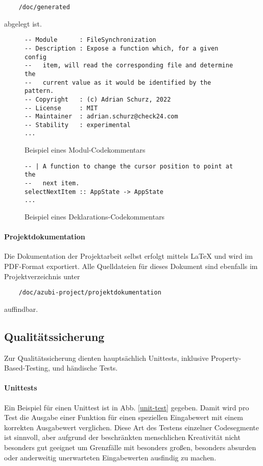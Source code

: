 \begin{verbatim}
    /doc/generated
\end{verbatim}

abgelegt ist.

\begin{figure}
    \caption{Beispiel eines Modul-Codekommentars}
    \label{codecomment-module}
    \begin{verbatim}
-- Module      : FileSynchronization
-- Description : Expose a function which, for a given config
--   item, will read the corresponding file and determine the
--   current value as it would be identified by the pattern.
-- Copyright   : (c) Adrian Schurz, 2022
-- License     : MIT
-- Maintainer  : adrian.schurz@check24.com
-- Stability   : experimental
...
    \end{verbatim}
\end{figure}

\begin{figure}
    \caption{Beispiel eines Deklarations-Codekommentars}
    \label{codecomment-declaration}
    \begin{verbatim}
-- | A function to change the cursor position to point at the
--   next item.
selectNextItem :: AppState -> AppState
...
    \end{verbatim}
\end{figure}

\paragraph{Projektdokumentation}
Die Dokumentation der Projektarbeit selbst erfolgt mittels \LaTeX \cite{latex} und
wird im \gls{PDF}-Format exportiert. Alle Quelldateien für dieses Dokument sind
ebenfalls im Projektverzeichnis unter

\begin{verbatim}
    /doc/azubi-project/projektdokumentation
\end{verbatim}

auffindbar.

\subsection{Qualitätssicherung}
Zur Qualitätssicherung dienten hauptsächlich Unittests, inklusive \gls{Property-Based-Testing},
und händische Tests.

\paragraph{Unittests}
Ein Beispiel für einen Unittest ist in Abb. \ref{unit-test} gegeben. Damit wird
pro Test die Ausgabe einer Funktion für einen speziellen Eingabewert mit einem
korrekten Ausgabewert verglichen. Diese Art des Testens einzelner Codesegmente ist
sinnvoll, aber aufgrund der beschränkten menschlichen Kreativität nicht besonders
gut geeignet um Grenzfälle mit besonders großen, besonders absurden oder anderweitig
unerwarteten Eingabewerten ausfindig zu machen.

